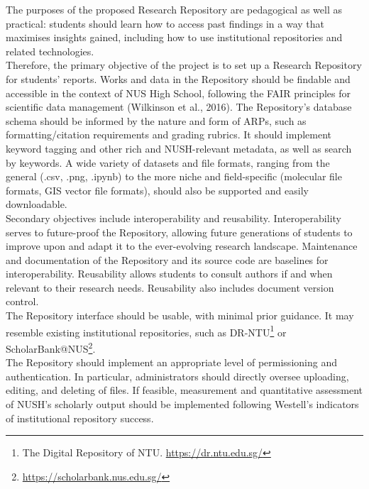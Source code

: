\documentclass{article}
\begin{document}
The purposes of the proposed Research Repository are pedagogical as well as practical: students should learn how to access past findings in a way that maximises insights gained, including how to use institutional repositories and related technologies. \\

Therefore, the primary objective of the project is to set up a Research Repository for students’ reports. Works and data in the Repository should be findable  and accessible in the context of NUS High School, following the FAIR principles for scientific data management (Wilkinson et al., 2016). The Repository’s database schema should be informed by the nature and form of ARPs, such as formatting/citation requirements and grading rubrics. It should implement keyword tagging and other rich and NUSH-relevant metadata, as well as search by keywords. A wide variety of datasets and file formats, ranging from the general (.csv, .png, .ipynb) to the more niche and field-specific (molecular file formats, GIS vector file formats), should also be supported and easily downloadable. \\
	
Secondary objectives include interoperability and reusability. Interoperability serves to future-proof the Repository, allowing future generations of students to improve upon and adapt it to the ever-evolving research landscape. Maintenance and documentation of the Repository and its source code are baselines for interoperability. Reusability allows students to consult authors if and when relevant to their research needs. Reusability also includes document version control. \\

The Repository interface should be usable, with minimal prior guidance. It may resemble existing institutional repositories, such as DR-NTU\footnote{The Digital Repository of NTU. \url{https://dr.ntu.edu.sg/}} or ScholarBank@NUS\footnote{\url{https://scholarbank.nus.edu.sg/}}. \\

The Repository should implement an appropriate level of permissioning and authentication. In particular, administrators should directly oversee uploading, editing, and deleting of files. If feasible, measurement and quantitative assessment of NUSH’s scholarly output should be implemented following Westell’s \parencite*{wilkinson_fair_2016} indicators of institutional repository success. \\
\end{document}
